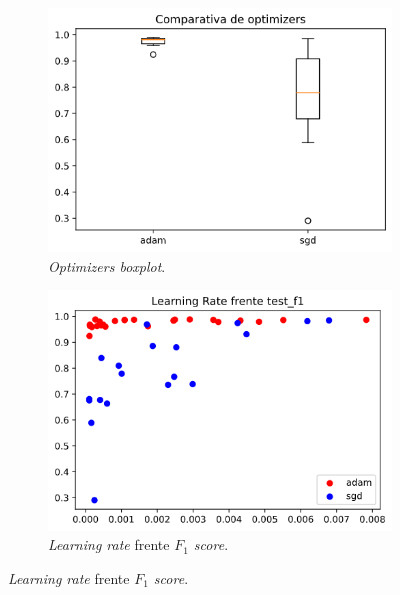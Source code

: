\begin{figure}[H]
\begin{subfigure}{.5\textwidth}
  \centering
  \includegraphics[width=.8\linewidth]{imagenes/06_Experimentacion/caeimages/caeoptimizers.png}
  \caption{\textit{Optimizers boxplot}.}
  \label{fig:caeoptimizers}
\end{subfigure}
\begin{subfigure}{.5\textwidth}
  \centering
  \includegraphics[width=.8\linewidth]{imagenes/06_Experimentacion/caeimages/caelr.png}  
  \caption{\textit{Learning rate} frente \textit{$F_1$ score}.}
  \label{fig:caelr}
\end{subfigure}

\newline


\end{figure}
